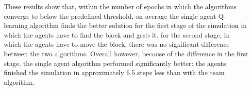 These results show that, within the number of epochs in which the algorithms converge to below the predefined threshold, on average the single agent Q-learning algorithm finds the better solution for the first stage of the simulation in which the agents have to find the block and grab it. for the second stage, in which the agents have to move the block, there was no significant difference between the two algorithms. Overall however, because of the difference in the first stage, the single agent algorithm performed significantly better: the agents finished the simulation in approximately 6.5 steps less than with the team algorithm.